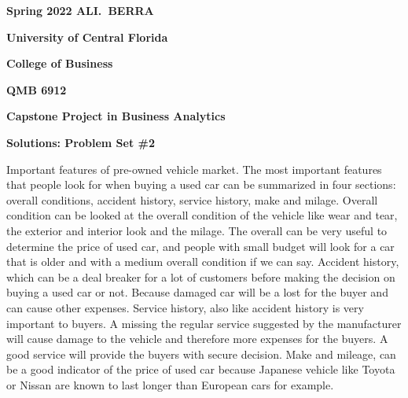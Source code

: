 \documentclass[12pt]{book}
\begin{document}
\pagestyle{empty}



{\noindent\bf Spring 2022 \hfill ALI.~BERRA}



\vskip 16pt



\centerline{\bf University of Central Florida}



\centerline{\bf College of Business}



\vskip 16pt



\centerline{\bf QMB 6912}



\centerline{\bf Capstone Project in Business Analytics}



\vskip 10pt



\centerline{\bf Solutions: Problem Set \#2}



\vskip 32pt







Important features of pre-owned vehicle market.  
\vskip 12pt
The most important features that people look for when buying a used car can be summarized in four sections: overall conditions, accident history, service history, make and milage. 
\vskip 12pt
Overall condition can be looked at the overall condition of the vehicle like wear and tear, the exterior and interior look and the milage. The overall can be very useful to determine the price of used car, and people with small budget will look for a car that is older and with a medium overall condition if we can say. 
\vskip 12pt
Accident history, which can be a deal breaker for a lot of customers before making the decision on buying a used car or not. Because damaged car will be a lost for the buyer and can cause other expenses. 
\vskip 12pt
Service history, also like accident history is very important to buyers. A missing the regular service suggested by the manufacturer will cause damage to the vehicle and therefore more expenses for the buyers.  A good service will provide the buyers with secure decision. 
\vskip 12pt
Make and mileage, can be a good indicator of the price of used car because Japanese vehicle like Toyota or Nissan are known to last longer than European cars for example. 
\end{document}
